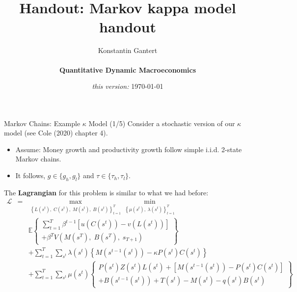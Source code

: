 \documentclass[10pt,c,aspectratio=1610,handout]{beamer}
\begin{document}
\title{Handout: Markov kappa model handout}
\author[Konstantin Gantert]{\begin{large} Konstantin Gantert \end{large} \\ \textbf{Quantitative Dynamic Macroeconomics}}
\date{\textit{this version:} \today}

\beamertemplatenavigationsymbolsempty

{ 
\frame{\titlepage}}
 \addtocounter{framenumber}{-1}
\begin{frame}{Markov Chains: Example $\kappa$ Model (1/5)}%
  Consider a stochastic version of our $\kappa$ model {\footnotesize(see Cole (2020) chapter 4)}.%
  \begin{itemize}%
    \item[$\blacktriangleright$] Assume: Money growth and productivity growth follow simple i.i.d. 2-state Markov chains.%
    \item[$\blacktriangleright$] It follows, $g \in \{g_h,g_l\}$ and $\tau \in \{\tau_h,\tau_l\}$.%
  \end{itemize}%
  \pause%
  The \textbf{Lagrangian} for this problem is similar to what we had before:%
  \begin{eqnarray*}%
    \mathcal{L} &\mathcal{=}&\max_{\left\{L(s^{t}),\;C(s^{t}),\;M(s^{t}),\;B(s^{t})\right\}_{t=1}^{T}}\min_{\left\{ \mu(s^{t}),\;\lambda (s^{t})\right\} _{t=1}^{T}} \\%
    && \mathbb{E} \left\{%
    \begin{array}{c}%
      \sum_{t=1}^T \beta ^{t-1}\left[ u(C(s^{t}))-v(L(s^{t}))\right] \\%
      +\beta ^{T}V(M(s^{T}),\;B(s^{T}),\;s_{T+1})%
    \end{array}%
    \right\} \\%
    &&+\sum_{t=1}^T\sum_{s^{t}}\lambda (s^{t})\left\{%
    M(s^{t-1}(s^{t}))-\kappa P(s^{t})C(s^{t})\right\} \\%
    &&+\sum_{t=1}^T\sum_{s^{t}}\mu (s^{t})\left\{%
    \begin{array}{c}%
      P(s^{t})Z(s^{t})L(s^{t})+\left[ M(s^{t-1}(s^{t}))-P(s^{t})C(s^{t})\right] \\%
      +B(s^{t-1}(s^{t}))+T(s^{t})-M(s^{t})-q(s^{t})B(s^{t})%
    \end{array}%
    \right\}%
  \end{eqnarray*}%
\end{frame}%
\end{document}
